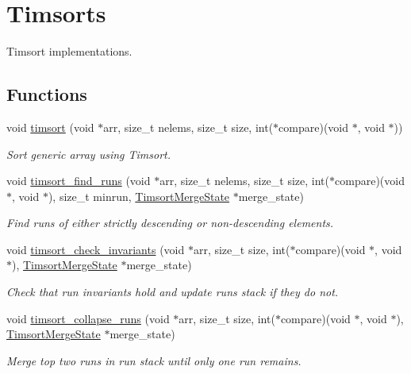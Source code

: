 \hypertarget{group__Timsort}{}\section{Timsorts}
\label{group__Timsort}


Timsort implementations.  


\subsection*{Functions}
\begin{DoxyCompactItemize}
\item 
void \hyperlink{group__Timsort_gae421187852c6c109058362a81539de0f}{timsort} (void $\ast$arr, size\+\_\+t nelems, size\+\_\+t size, int($\ast$compare)(void $\ast$, void $\ast$))
\begin{DoxyCompactList}\small\item\em Sort generic array using Timsort. \end{DoxyCompactList}\item 
void \hyperlink{group__Timsort_ga95a12fa41d6574d3350a908cf0fcb63d}{timsort\+\_\+find\+\_\+runs} (void $\ast$arr, size\+\_\+t nelems, size\+\_\+t size, int($\ast$compare)(void $\ast$, void $\ast$), size\+\_\+t minrun, \hyperlink{structTimsortMergeState}{Timsort\+Merge\+State} $\ast$merge\+\_\+state)
\begin{DoxyCompactList}\small\item\em Find runs of either strictly descending or non-\/descending elements. \end{DoxyCompactList}\item 
void \hyperlink{group__Timsort_gac2adf9d2399deb49f6c8bb71ef13829f}{timsort\+\_\+check\+\_\+invariants} (void $\ast$arr, size\+\_\+t size, int($\ast$compare)(void $\ast$, void $\ast$), \hyperlink{structTimsortMergeState}{Timsort\+Merge\+State} $\ast$merge\+\_\+state)
\begin{DoxyCompactList}\small\item\em Check that run invariants hold and update runs stack if they do not. \end{DoxyCompactList}\item 
void \hyperlink{group__Timsort_gabbc386bb95547fd09350b3aaf72c8e26}{timsort\+\_\+collapse\+\_\+runs} (void $\ast$arr, size\+\_\+t size, int($\ast$compare)(void $\ast$, void $\ast$), \hyperlink{structTimsortMergeState}{Timsort\+Merge\+State} $\ast$merge\+\_\+state)
\begin{DoxyCompactList}\small\item\em Merge top two runs in run stack until only one run remains. \end{DoxyCompactList}\item 

\end{DoxyCompactItemize}
